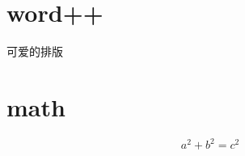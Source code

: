 \documentclass[UTF8]{ctexart}
\begin{document}
    \section{word++}
    可爱的排版
    \section{math}
    \[
        a^2 + b^2 = c^2
    \]
\end{document}
